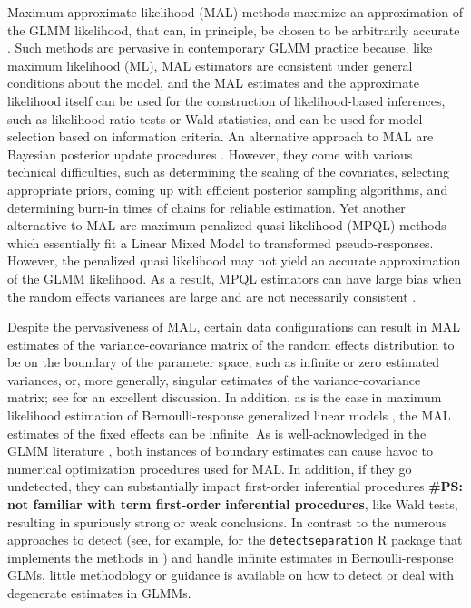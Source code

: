 \documentclass[11pt, a4paper]{article}
\newcommand{\PS}[1]{{\noindent \color{red} \bf \#PS: #1}}
\theoremstyle{example} \newtheorem{example}{Example}[section]
\theoremstyle{theorem} \newtheorem{theorem}{Theorem}[section]
\begin{document}
Maximum approximate likelihood (MAL) methods maximize an 
approximation of the GLMM likelihood, that can, in principle, be
chosen to be arbitrarily accurate \citep[see, for example,
][]{raudenbush+etal:2000, pinheiro+chao:2006}. Such methods are
pervasive in contemporary GLMM practice because, like maximum
likelihood (ML), MAL estimators are consistent under general conditions
about the model, and the MAL estimates and the approximate likelihood
itself can be used for the construction of likelihood-based
inferences, such as likelihood-ratio tests or Wald
statistics, and can be used for model selection based on information criteria. An
alternative approach to MAL are Bayesian posterior update procedures
\citep[see, for example,][]{zhao+etal:2006,browne+draper:2006}. However, they come with
various technical difficulties, such as determining the scaling of the
covariates, selecting appropriate priors, coming up with efficient
posterior sampling algorithms, and determining burn-in times of chains
for reliable estimation. Yet another alternative to MAL are maximum
penalized quasi-likelihood (MPQL) methods \citep{schall:1991,
  wolfinger+oconnel:1993, breslow+clayton:1993} which essentially fit a Linear Mixed Model to transformed pseudo-responses. However, the penalized quasi likelihood may not
yield an accurate approximation of the GLMM likelihood. As a result,
MPQL estimators can have large bias when the random effects
variances are large
\citep{bolker+etal:2009,rodriguez+goldman1995} and are
not necessarily consistent \citep[Chapter 3.1]{jiang:2017}.

Despite the pervasiveness of MAL, certain data configurations can
result in MAL estimates of the variance-covariance matrix of the
random effects distribution to be on the boundary of the parameter
space, such as infinite or zero estimated variances, or, more
generally, singular estimates of the variance-covariance matrix; see
\cite{chung+etal:2013} for an excellent discussion. In
addition, as is the case in maximum likelihood estimation of
Bernoulli-response generalized linear models \citep[GLMs; see, for
example][Chapter 4]{mccullagh+nelder:1989}, the MAL estimates of the
fixed effects can be
infinite. As is well-acknowledged in the GLMM literature \citep[see,
for example][]{bolker+etal:2009, bolker:2018,
  pasch+etal:2013}, both instances of boundary estimates can
cause havoc to numerical optimization procedures used for MAL. In
addition, if they go undetected, they can substantially impact
first-order inferential procedures \PS{not familiar with term first-order inferential procedures}, like Wald tests, resulting in
spuriously strong or weak conclusions. In contrast to the
numerous approaches to detect (see, for example,
\citealt{kosmidis+schumacher:2021} for the \texttt{detectseparation} R
package that implements the methods in \citealt{konis:2017}) and
handle \citep[see, for example,][]{kosmidis+firth:2020,
 heinze+schemper:2002, gelman+etal:2008} infinite
estimates in Bernoulli-response GLMs, little methodology or guidance
is available on how to detect or deal with degenerate estimates in
GLMMs.
\end{document}
